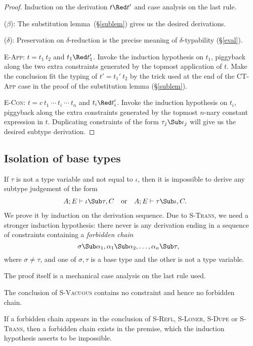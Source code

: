 \documentclass{amsart}
\theoremstyle{definition}
\begin{document}
\begin{proof}
Induction on the derivation $t\Red t'$ and case analysis on the
last rule.

\Case($\beta$): The substitution lemma~(\S\ref{sublem}) gives us
the desired derivations.

\Case($\delta$): Preservation on $\delta$-reduction is the
precise meaning of $\delta$-typability (\S\ref{eval}).

\Case\textsc{E-App}: $t=t_1~t_2$ and $t_1\Red t_1'$. Invoke the
induction hypothesis on $t_1$, piggyback along the two extra
constraints generated by the topmost application of $t$. Make
the conclusion fit the typing of $t'=t_1'~t_2$ by the trick used
at the end of the \textsc{CT-App} case in the proof of the
substitution lemma (\S\ref{sublem}).

\Case\textsc{E-Con}: $t=c~t_1~\cdots~t_i~\cdots~t_n$ and $t_i\Red
t_i'$. Invoke the induction hypothesis on $t_i$, piggyback along
the extra constraints generated by the topmost $n$-nary constant
expression in $t$. Duplicating constraints of the form
$\tau_j\Sub\iota_j$ will give us the desired subtype derivation.
\end{proof}

\subsection{Isolation of base types}
\label{isotypes}
If $\tau$ is not a type variable and not equal to $\iota$, then
it is impossible to derive any subtype judgement of the form
\begin{align*}
A;E&\vdash \iota\Sub\tau,C&
&\mbox{or}&
A;E&\vdash\tau\Sub\iota,C.
\end{align*}
We prove it by induction on the derivation sequence. Due to
\textsc{S-Trans}, we need a stronger induction hypothesis: there
never is any derivation ending in a sequence of constraints
containing a \emph{forbidden chain}
\[
\sigma\Sub\alpha_1,\alpha_1\Sub\alpha_2,\ldots,\alpha_n\Sub\tau,
\]
where $\sigma\neq\tau$, and one of $\sigma,\tau$ is a base type
and the other is not a type variable.

The proof itself is a mechanical case analysis on the last rule
used.

The conclusion of \textsc{S-Vacuous} contains no constraint and
hence no forbidden chain.

If a forbidden chain appears in the conclusion of \textsc{S-Refl},
\textsc{S-Loner}, \textsc{S-Dupe} or \textsc{S-Trans}, then a
forbidden chain exists in the premise, which the induction
hypothesis asserts to be impossible.
\end{document}
